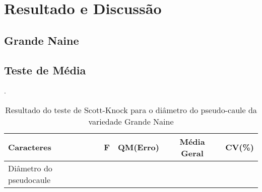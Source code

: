 \chapter{Resultado e Discussão}
\section{Grande Naine}

\section{Teste de Média}
  
 
\begin{table}[!htb]
 	\begin{center}
 		\caption{Resultado do teste de Scott-Knock para o diâmetro do pseudo-caule da variedade Grande Naine}.
	 	\begin{tabular}{lcccc}
 		\toprule
 		\toprule
 		\textbf{Caracteres} & \textbf{F}  & \textbf{QM(Erro)} & \textbf{Média Geral} & CV(\%) \\
		\hline
		Diâmetro do pseudocaule & & & & \\
 		\end{tabular}\\
 	\end{center}
\end{table}